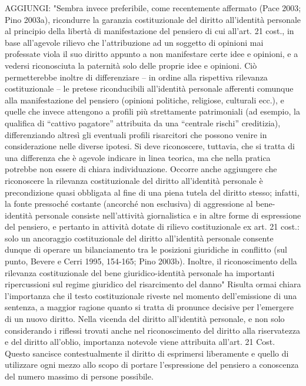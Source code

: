 AGGIUNGI: 
"Sembra  invece  preferibile,  come  recentemente  affermato  (Pace  2003; Pino  2003a),  ricondurre  la  garanzia  costituzionale del  diritto  all’identità personale al principio della libertà di manifestazione del pensiero di cui all’art. 21 cost., in base all’agevole rilievo che l’attribuzione ad un soggetto di opinioni mai  professate  viola  il  suo  diritto  appunto  a  non  manifestare  certe  idee  e opinioni, e a vedersi riconosciuta la paternità solo delle proprie idee e opinioni. Ciò permetterebbe inoltre di differenziare – in ordine alla rispettiva rilevanza costituzionale  –  le  pretese  riconducibili  all’identità  personale  afferenti comunque  alla  manifestazione  del  pensiero  (opinioni  politiche,  religiose, culturali  ecc.),  e  quelle  che  invece  attengono  a  profili  più  strettamente patrimoniali  (ad  esempio,  la  qualifica  di  “cattivo pagatore”  attribuita  da  una “centrale rischi” creditizia), differenziando altresì gli eventuali profili risarcitori che possono venire in considerazione nelle diverse ipotesi. Si deve riconoscere, tuttavia, che si tratta di una differenza che è agevole indicare in linea teorica, ma che nella pratica potrebbe non essere di chiara individuazione. Occorre anche aggiungere che riconoscere la rilevanza costituzionale del diritto all’identità personale è precondizione quasi obbligata al fine di una piena tutela  del  diritto  stesso;  infatti,  la  fonte  pressoché  costante  (ancorché  non esclusiva)  di  aggressione  al  bene-identità  personale  consiste  nell’attività giornalistica e in altre forme di espressione del pensiero, e pertanto in attività dotate  di  rilievo  costituzionale  ex  art.  21  cost.: solo  un  ancoraggio costituzionale del diritto all’identità personale consente dunque di operare un bilanciamento tra le posizioni giuridiche in conflitto (sul punto, Bevere e Cerri 1995,  154-165;  Pino  2003b).  Inoltre,  il  riconoscimento  della  rilevanza costituzionale del bene giuridico-identità personale ha importanti ripercussioni sul regime giuridico del risarcimento del danno"
Risulta ormai chiara l'importanza che il testo costituzionale riveste nel momento dell'emissione di una sentenza, a maggior ragione quanto si tratta di pronunce decisive per l'emergere di un nuovo diritto. Nella vicenda del diritto all'identità personale, e non solo considerando i riflessi trovati anche nel riconoscimento del diritto alla riservatezza e del diritto all'oblio, importanza notevole viene attribuita all'art. 21 Cost.
Questo sancisce contestualmente il diritto di esprimersi liberamente e quello di utilizzare ogni mezzo allo scopo di portare l'espressione del pensiero a conoscenza del numero massimo di persone possibile. 
